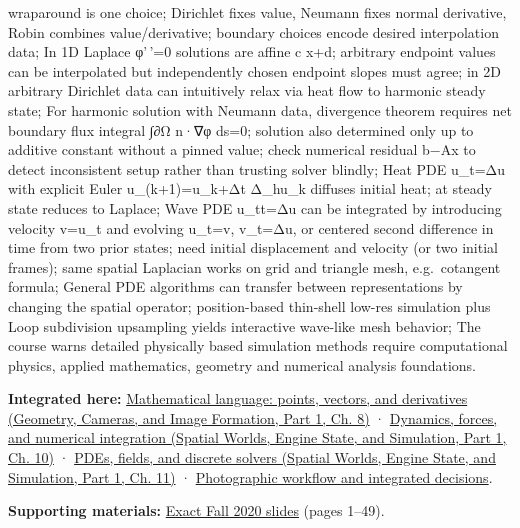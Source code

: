 wraparound is one choice; Dirichlet fixes value, Neumann fixes normal derivative, Robin combines value/derivative; boundary choices encode desired interpolation data; In 1D Laplace φ'\,'=0 solutions are affine c x+d; arbitrary endpoint values can be interpolated but independently chosen endpoint slopes must agree; in 2D arbitrary Dirichlet data can intuitively relax via heat flow to harmonic steady state; For harmonic solution with Neumann data, divergence theorem requires net boundary flux integral ∫∂Ω n·∇φ ds=0; solution also determined only up to additive constant without a pinned value; check numerical residual b−Ax to detect inconsistent setup rather than trusting solver blindly; Heat PDE u\_t=Δu with explicit Euler u\_(k+1)=u\_k+Δt Δ\_hu\_k diffuses initial heat; at steady state reduces to Laplace; Wave PDE u\_tt=Δu can be integrated by introducing velocity v=u\_t and evolving u\_t=v, v\_t=Δu, or centered second difference in time from two prior states; need initial displacement and velocity (or two initial frames); same spatial Laplacian works on grid and triangle mesh, e.g.~cotangent formula; General PDE algorithms can transfer between representations by changing the spatial operator; position-based thin-shell low-res simulation plus Loop subdivision upsampling yields interactive wave-like mesh behavior; The course warns detailed physically based simulation methods require computational physics, applied mathematics, geometry and numerical analysis foundations.

\textbf{Integrated here:} \href{../03-Geometry-Cameras-and-Image-Formation-P01/main.pdf\#nameddest=03-visual-computing-i-ch001-mathematical-language-points-vectors-and-derivatives}{Mathematical language: points, vectors, and derivatives (Geometry, Cameras, and Image Formation, Part 1, Ch. 8)} · \href{../05-Spatial-Worlds-Engine-State-and-Simulation-P01/main.pdf\#nameddest=04-visual-computing-ii-ch029-dynamics-forces-and-numerical-integration}{Dynamics, forces, and numerical integration (Spatial Worlds, Engine State, and Simulation, Part 1, Ch. 10)} · \href{../05-Spatial-Worlds-Engine-State-and-Simulation-P01/main.pdf\#nameddest=04-visual-computing-ii-ch030-pdes-fields-and-discrete-solvers}{PDEs, fields, and discrete solvers (Spatial Worlds, Engine State, and Simulation, Part 1, Ch. 11)} · \hyperref[04-visual-computing-ii-ch034-photographic-workflow-and-integrated-decisions]{Photographic workflow and integrated decisions}.

\textbf{Supporting materials:} \href{https://15462.courses.cs.cmu.edu/fall2020content/lectures/23_pdes/23_pdes_slides.pdf}{Exact Fall 2020 slides} (pages 1--49).

